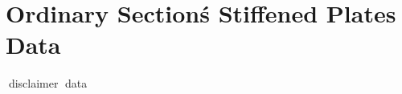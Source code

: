 \chapter{Ordinary Section\'s Stiffened Plates Data}
\label{ch:ordinary_stiffeners_data}
^^^disclaimer
^^^data